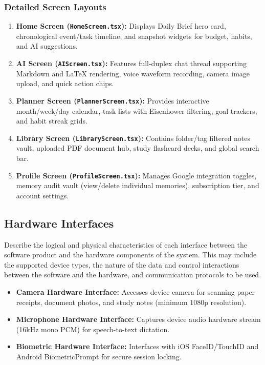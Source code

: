 \documentclass[11pt,a4paper]{article}
\begin{document}
\subsubsection{Detailed Screen Layouts}
\begin{enumerate}
    \item \textbf{Home Screen (\texttt{HomeScreen.tsx}):} Displays Daily Brief hero card, chronological event/task timeline, and snapshot widgets for budget, habits, and AI suggestions.
    \item \textbf{AI Screen (\texttt{AIScreen.tsx}):} Features full-duplex chat thread supporting Markdown and LaTeX rendering, voice waveform recording, camera image upload, and quick action chips.
    \item \textbf{Planner Screen (\texttt{PlannerScreen.tsx}):} Provides interactive month/week/day calendar, task lists with Eisenhower filtering, goal trackers, and habit streak grids.
    \item \textbf{Library Screen (\texttt{LibraryScreen.tsx}):} Contains folder/tag filtered notes vault, uploaded PDF document hub, study flashcard decks, and global search bar.
    \item \textbf{Profile Screen (\texttt{ProfileScreen.tsx}):} Manages Google integration toggles, memory audit vault (view/delete individual memories), subscription tier, and account settings.
\end{enumerate}

\subsection{Hardware Interfaces}
Describe the logical and physical characteristics of each interface between the software product and the hardware components of the system. This may include the supported device types, the nature of the data and control interactions between the software and the hardware, and communication protocols to be used.

\begin{itemize}
    \item \textbf{Camera Hardware Interface:} Accesses device camera for scanning paper receipts, document photos, and study notes (minimum 1080p resolution).
    \item \textbf{Microphone Hardware Interface:} Captures device audio hardware stream (16kHz mono PCM) for speech-to-text dictation.
    \item \textbf{Biometric Hardware Interface:} Interfaces with iOS FaceID/TouchID and Android BiometricPrompt for secure session locking.
\end{itemize}
\end{document}
